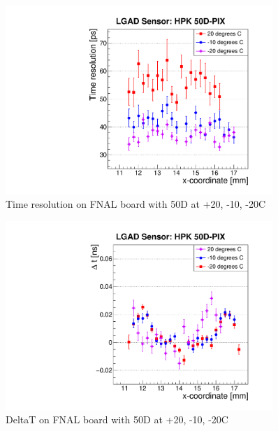 \documentclass[preprint,1p]{elsarticle}
\begin{document}
\begin{figure}[htbp] 
\centering
\includegraphics[width=0.9\textwidth]{figs/FNAL_TimeResolution_vs_X_HPK50D_TemperatureDependance.pdf} 
\caption{Time resolution on FNAL board with 50D at +20, -10, -20C} 
\label{fig:Sensors} 
\end{figure} 

\begin{figure}[htbp] 
\centering
\includegraphics[width=0.9\textwidth]{figs/FNAL_MeanTime_vs_X_HPK50D_TemperatureDependance.pdf} 
\caption{DeltaT on FNAL board with 50D at +20, -10, -20C} 
\label{fig:Sensors} 
\end{figure} 
\end{document}
